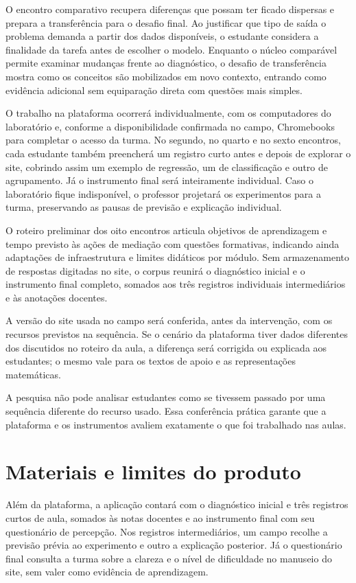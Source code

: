 O encontro comparativo recupera diferenças que possam ter ficado dispersas e prepara a transferência para o desafio final. Ao justificar que tipo de saída o problema demanda a partir dos dados disponíveis, o estudante considera a finalidade da tarefa antes de escolher o modelo. Enquanto o núcleo comparável permite examinar mudanças frente ao diagnóstico, o desafio de transferência mostra como os conceitos são mobilizados em novo contexto, entrando como evidência adicional sem equiparação direta com questões mais simples.

O trabalho na plataforma ocorrerá individualmente, com os computadores do laboratório e, conforme a disponibilidade confirmada no campo, Chromebooks para completar o acesso da turma. No segundo, no quarto e no sexto encontros, cada estudante também preencherá um registro curto antes e depois de explorar o site, cobrindo assim um exemplo de regressão, um de classificação e outro de agrupamento. Já o instrumento final será inteiramente individual. Caso o laboratório fique indisponível, o professor projetará os experimentos para a turma, preservando as pausas de previsão e explicação individual.

O roteiro preliminar dos oito encontros articula objetivos de aprendizagem e tempo previsto às ações de mediação com questões formativas, indicando ainda adaptações de infraestrutura e limites didáticos por módulo. Sem armazenamento de respostas digitadas no site, o corpus reunirá o diagnóstico inicial e o instrumento final completo, somados aos três registros individuais intermediários e às anotações docentes.

A versão do site usada no campo será conferida, antes da intervenção, com os recursos previstos na sequência. Se o cenário da plataforma tiver dados diferentes dos discutidos no roteiro da aula, a diferença será corrigida ou explicada aos estudantes; o mesmo vale para os textos de apoio e as representações matemáticas.

A pesquisa não pode analisar estudantes como se tivessem passado por uma sequência diferente do recurso usado. Essa conferência prática garante que a plataforma e os instrumentos avaliem exatamente o que foi trabalhado nas aulas.

\section{Materiais e limites do produto}

Além da plataforma, a aplicação contará com o diagnóstico inicial e três registros curtos de aula, somados às notas docentes e ao instrumento final com seu questionário de percepção. Nos registros intermediários, um campo recolhe a previsão prévia ao experimento e outro a explicação posterior. Já o questionário final consulta a turma sobre a clareza e o nível de dificuldade no manuseio do site, sem valer como evidência de aprendizagem.


